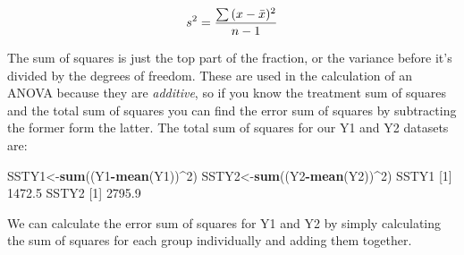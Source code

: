 \documentclass[
]{book}
\newenvironment{Shaded}{\begin{snugshade}}{\end{snugshade}}
\newcommand{\DecValTok}[1]{\textcolor[rgb]{0.00,0.00,0.81}{#1}}
\newcommand{\FloatTok}[1]{\textcolor[rgb]{0.00,0.00,0.81}{#1}}
\newcommand{\KeywordTok}[1]{\textcolor[rgb]{0.13,0.29,0.53}{\textbf{#1}}}
\newcommand{\NormalTok}[1]{#1}
\newcommand{\OperatorTok}[1]{\textcolor[rgb]{0.81,0.36,0.00}{\textbf{#1}}}
\begin{document}
\[ \Large s^2 = \frac{\sum{(x-\bar{x})^2}}{n-1}\]

The sum of squares is just the top part of the fraction, or the variance before it's divided by the degrees of freedom. These are used in the calculation of an ANOVA because they are \emph{additive}, so if you know the treatment sum of squares and the total sum of squares you can find the error sum of squares by subtracting the former form the latter. The total sum of squares for our Y1 and Y2 datasets are:

\begin{Shaded}
\begin{Highlighting}[]
\NormalTok{SSTY1<-}\KeywordTok{sum}\NormalTok{((Y1}\OperatorTok{-}\KeywordTok{mean}\NormalTok{(Y1))}\OperatorTok{^}\DecValTok{2}\NormalTok{)}
\NormalTok{SSTY2<-}\KeywordTok{sum}\NormalTok{((Y2}\OperatorTok{-}\KeywordTok{mean}\NormalTok{(Y2))}\OperatorTok{^}\DecValTok{2}\NormalTok{)}
\NormalTok{SSTY1}
\NormalTok{[}\DecValTok{1}\NormalTok{] }\FloatTok{1472.5}
\NormalTok{SSTY2}
\NormalTok{[}\DecValTok{1}\NormalTok{] }\FloatTok{2795.9}
\end{Highlighting}
\end{Shaded}

We can calculate the error sum of squares for Y1 and Y2 by simply calculating the sum of squares for each group individually and adding them together.
\end{document}
